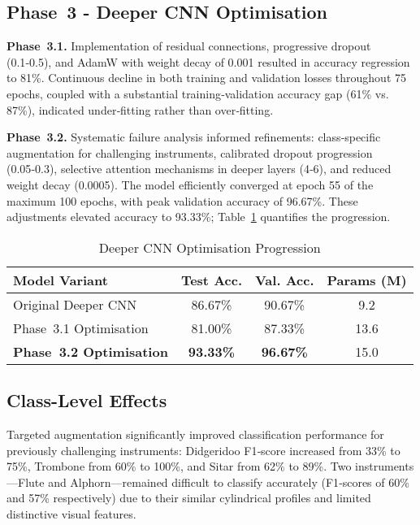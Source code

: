 \newpage
\subsection{Phase~3 - Deeper CNN Optimisation}

\noindent
\textbf{Phase~3.1.} Implementation of residual connections, progressive dropout (0.1‑0.5), and AdamW with weight decay of 0.001 resulted in accuracy regression to 81\%. Continuous decline in both training and validation losses throughout 75 epochs, coupled with a substantial training‑validation accuracy gap (61\% vs. 87\%), indicated under‑fitting rather than over‑fitting.

\textbf{Phase~3.2.} Systematic failure analysis informed refinements: class‑specific augmentation for challenging instruments, calibrated dropout progression (0.05‑0.3), selective attention mechanisms in deeper layers (4‑6), and reduced weight decay (0.0005). The model efficiently converged at epoch 55 of the maximum 100 epochs, with peak validation accuracy of 96.67\%. These adjustments elevated accuracy to 93.33\%; Table~\ref{tab:opt} quantifies the progression.

\begin{table}[ht]
\caption{\small Deeper CNN Optimisation Progression}
\label{tab:opt}
\centering
\begin{tabular}{lccc}
\toprule
Model Variant & Test Acc. & Val. Acc. & Params (M) \\
\midrule
Original Deeper CNN & 86.67\% & 90.67\% & 9.2 \\
Phase~3.1 Optimisation & 81.00\% & 87.33\% & 13.6 \\
\textbf{Phase~3.2 Optimisation} & \textbf{93.33\%} & \textbf{96.67\%} & 15.0 \\
\bottomrule
\end{tabular}
\end{table}

\subsection{Class-Level Effects}

\noindent
Targeted augmentation significantly improved classification performance for previously challenging instruments: Didgeridoo F1‑score increased from 33\% to 75\%, Trombone from 60\% to 100\%, and Sitar from 62\% to 89\%. Two instruments—Flute and Alphorn—remained difficult to classify accurately (F1‑scores of 60\% and 57\% respectively) due to their similar cylindrical profiles and limited distinctive visual features.

